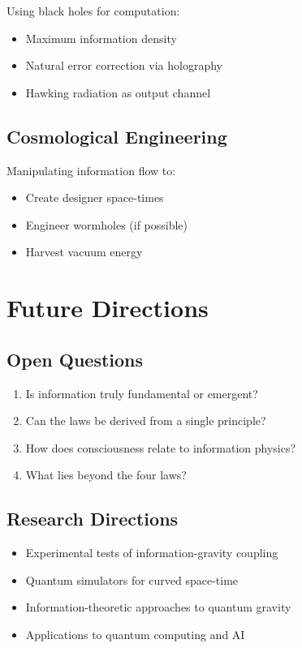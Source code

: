 \documentclass[11pt,a4paper]{article}
\theoremstyle{definition}
\begin{document}
Using black holes for computation:
\begin{itemize}
\item Maximum information density
\item Natural error correction via holography
\item Hawking radiation as output channel
\end{itemize}

\subsection{Cosmological Engineering}

Manipulating information flow to:
\begin{itemize}
\item Create designer space-times
\item Engineer wormholes (if possible)
\item Harvest vacuum energy
\end{itemize}

\section{Future Directions}

\subsection{Open Questions}

\begin{enumerate}
\item Is information truly fundamental or emergent?
\item Can the laws be derived from a single principle?
\item How does consciousness relate to information physics?
\item What lies beyond the four laws?
\end{enumerate}

\subsection{Research Directions}

\begin{itemize}
\item Experimental tests of information-gravity coupling
\item Quantum simulators for curved space-time
\item Information-theoretic approaches to quantum gravity
\item Applications to quantum computing and AI
\end{itemize}
\end{document}
